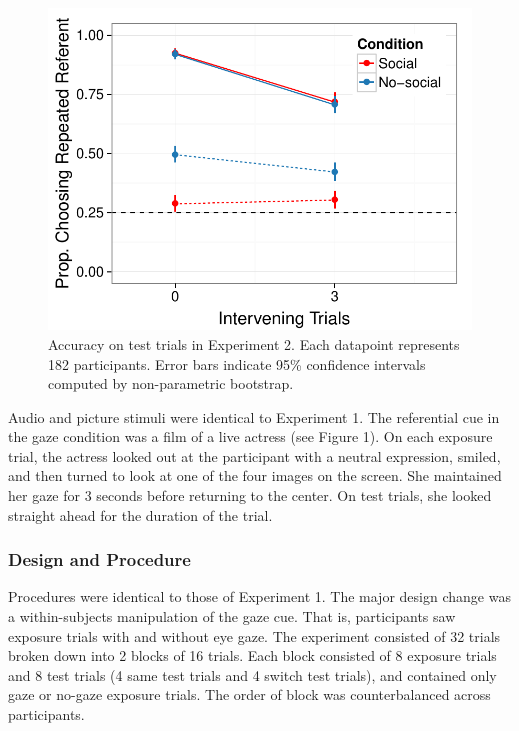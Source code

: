 \documentclass[10pt,letterpaper]{article}
\begin{document}
\begin{figure}[t!]
\begin{center}
\includegraphics[scale=0.43]{plots_figs/acc-test-expt2}
\end{center}
\caption{Accuracy on test trials in Experiment 2. Each datapoint represents 182 participants. Error bars indicate 95\% confidence intervals computed by non-parametric bootstrap.}
\end{figure}

Audio and picture stimuli were identical to Experiment 1. The referential cue in the gaze condition was a film of a live actress (see Figure 1). On each exposure trial, the actress looked out at the participant with a neutral expression, smiled, and then turned to look at one of the four images on the screen. She maintained her gaze for 3 seconds before returning to the center. On test trials, she looked straight ahead for the duration of the trial. 

\subsubsection{Design and Procedure}

Procedures were identical to those of Experiment 1. The major design change was a within-subjects manipulation of the gaze cue. That is, participants saw exposure trials with and without eye gaze. The experiment consisted of 32 trials broken down into 2 blocks of 16 trials. Each block consisted of 8 exposure trials and 8 test trials (4 same test trials and 4 switch test trials), and contained only gaze or no-gaze exposure trials. The order of block was counterbalanced across participants. 
\end{document}
